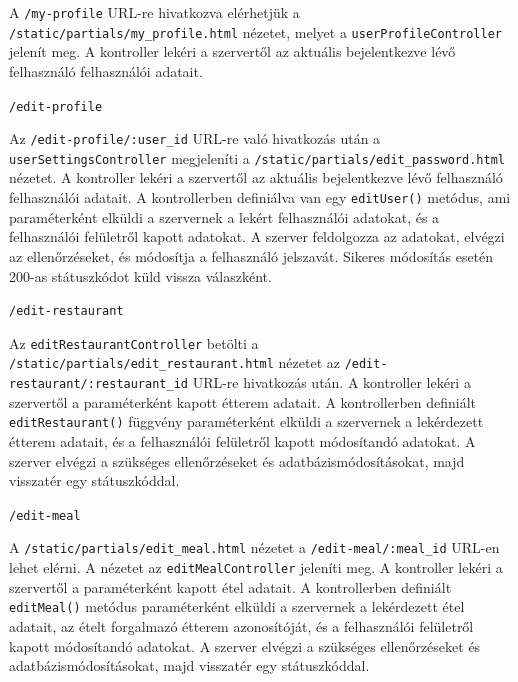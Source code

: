 A \texttt{/my-profile} URL-re hivatkozva elérhetjük a \texttt{/static/partials/my\_profile.html} nézetet, melyet a \texttt{userProfileController} jelenít meg. A kontroller lekéri a szervertől az aktuális bejelentkezve lévő felhasználó felhasználói adatait.

\bigskip

\noindent \texttt{/edit-profile}

Az \texttt{/edit-profile/:user\_id} URL-re való hivatkozás után a \texttt{userSettingsController} megjeleníti a \texttt{/static/partials/edit\_password.html} nézetet. A kontroller lekéri a szervertől az aktuális bejelentkezve lévő felhasználó felhasználói adatait. A kontrollerben definiálva van egy \texttt{editUser()} metódus, ami paraméterként elküldi a szervernek a lekért felhasználói adatokat, és a felhasználói felületről kapott adatokat. A szerver feldolgozza az adatokat, elvégzi az ellenőrzéseket, és módosítja a felhasználó jelszavát. Sikeres módosítás esetén 200-as státuszkódot küld vissza válaszként.

\bigskip

\noindent \texttt{/edit-restaurant}

Az \texttt{editRestaurantController} betölti a \texttt{/static/partials/edit\_restaurant.html} nézetet az \texttt{/edit-restaurant/:restaurant\_id} URL-re hivatkozás után. A kontroller lekéri a szervertől a paraméterként kapott étterem adatait. A kontrollerben definiált \texttt{editRestaurant()} függvény paraméterként elküldi a szervernek a lekérdezett étterem adatait, és a felhasználói felületről kapott módosítandó adatokat. A szerver elvégzi a szükséges ellenőrzéseket és adatbázismódosításokat, majd visszatér egy státuszkóddal.

\bigskip

\noindent \texttt{/edit-meal}

A \texttt{/static/partials/edit\_meal.html} nézetet a \texttt{/edit-meal/:meal\_id} URL-en lehet elérni. A nézetet az \texttt{editMealController} jeleníti meg. A kontroller lekéri a szervertől a paraméterként kapott étel adatait. A kontrollerben definiált \texttt{editMeal()} metódus paraméterként elküldi a szervernek a lekérdezett étel adatait, az ételt forgalmazó étterem azonosítóját, és a felhasználói felületről kapott módosítandó adatokat. A szerver elvégzi a szükséges ellenőrzéseket és adatbázismódosításokat, majd visszatér egy státuszkóddal.
